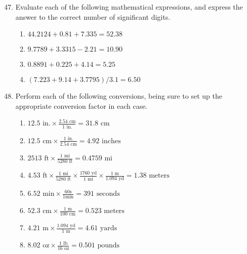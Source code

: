 \documentclass[12pt,letterpaper]{article}
\begin{document}
\begin{enumerate}
\setcounter{enumi}{46} %
\item 

Evaluate each of the following mathematical expressions, and express the answer to the correct number of significant digits. \\

\begin{enumerate}
\item $44.2124 + 0.81 + 7.335 = 52.38$ \\
\item $9.7789 + 3.3315 - 2.21 = 10.90$ \\
\item $0.8891 + 0.225 + 4.14 = 5.25$ \\
\item $(7.223 + 9.14 + 3.7795)/3.1 = 6.50$
\end{enumerate}

\pagebreak

\setcounter{enumi}{58} %
\item 

Perform each of the following conversions, being sure to set up the appropriate conversion factor in each case. \\

\begin{enumerate}
\item $12.5 \text{ in.} \times \frac{2.54 \text{ cm}}{1 \text{ in.}} = 31.8 \text{ cm}$\\
\item $12.5 \text{ cm} \times \frac{1 \text{ in.}}{2.54 \text{ cm}} = 4.92 \text{ inches}$\\
\item $2513 \text{ ft} \times \frac{1 \text{ mi}}{5280\text{ ft}} = 0.4759 \text{ mi}$\\
\item $4.53 \text{ ft} \times \frac{1 \text{ mi}}{5280\text{ ft}} \times \frac{1760\text{ yd}}{1\text{ mi}}
\times \frac{1\text{ m}}{1.094\text{ yd}} = 1.38 \text{ meters} $\\
\item $6.52 \text{ min} \times \frac{60 \text{s}}{1 \text{min}} = 391 \text{ seconds} $\\
\item $52.3 \text{ cm} \times \frac{1\text{ m}}{100\text{ cm}} = 0.523 \text{ meters} $\\
\item $4.21 \text{ m} \times \frac{1.094\text{ yd}}{1\text{ m}}= 4.61 \text{ yards} $\\
\item $8.02 \text{ oz} \times \frac{1\text{ lb}}{16\text{ oz}} = 0.501 \text{ pounds}$
\end{enumerate}


\end{enumerate}
\end{document}
